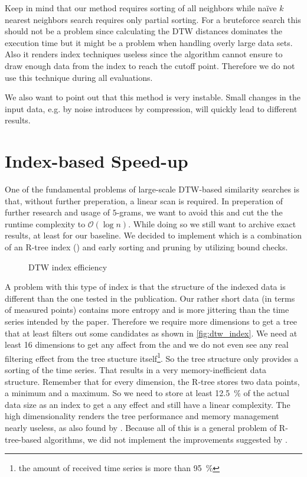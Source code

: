 Keep in mind that our method requires sorting of all neighbors while na{\"i}ve $k$ nearest neighbors search requires only partial sorting. For a bruteforce search this should not be a problem since calculating the DTW distances dominates the execution time but it might be a problem when handling overly large data sets. Also it renders index techniques useless since the algorithm cannot ensure to draw enough data from the index to reach the cutoff point. Therefore we do not use this technique during all evaluations.

We also want to point out that this method is very instable. Small changes in the input data, e.g. by noise introduces by compression, will quickly lead to different results.



\section{Index-based Speed-up}
\label{sec:baseline:speed}

One of the fundamental problems of large-scale DTW-based similarity searches is that, without further preperation, a linear scan is required. In preperation of further research and usage of $5$-grams, we want to avoid this and cut the the runtime complexity to $\mathcal{O}(\log{n})$. While doing so we still want to archive exact results, at least for our baseline. We decided to implement \cite{LB_Keogh} which is a combination of an R-tree index (\cite{rtree}) and early sorting and pruning by utilizing bound checks.

\begin{figure}
    \centering
    
    \caption{DTW index efficiency}
    \label{fig:dtw_index}
\end{figure}

A problem with this type of index is that the structure of the indexed data is different than the one tested in the publication. Our rather short data (in terms of measured points) contains more entropy and is more jittering than the time series intended by the paper. Therefore we require more dimensions to get a tree that at least filters out some candidates as shown in \autoref{fig:dtw_index}. We need at least \num{16} dimensions to get any affect from the  and we do not even see any real filtering effect from the tree stucture itself\footnote{the amount of received time series is more than \SI{95}{\percent}}. So the tree structure only provides a sorting of the time series. That results in a very memory-inefficient data structure. Remember that for every dimension, the R-tree stores two data points, a minimum and a maximum. So we need to store at least \SI{12.5}{\percent} of the actual data size as an index to get a any effect and still have a linear complexity. The high dimensionality renders the tree performance and memory management nearly useless, as also found by \cite{rtree_highdim}. Because all of this is a general problem of R-tree-based algorithms, we did not implement the improvements suggested by \cite{LB_Improved}.



